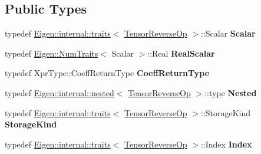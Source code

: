 \subsection*{Public Types}
\begin{DoxyCompactItemize}
\item 
\mbox{\label{class_eigen_1_1_tensor_reverse_op_ac42369cc21218288219c8ca109a981a8}} 
typedef \hyperlink{struct_eigen_1_1internal_1_1traits}{Eigen\+::internal\+::traits}$<$ \hyperlink{class_eigen_1_1_tensor_reverse_op}{Tensor\+Reverse\+Op} $>$\+::Scalar {\bfseries Scalar}
\item 
\mbox{\label{class_eigen_1_1_tensor_reverse_op_adf272883f88f102986b29b264d6e5833}} 
typedef \hyperlink{group___core___module_struct_eigen_1_1_num_traits}{Eigen\+::\+Num\+Traits}$<$ Scalar $>$\+::Real {\bfseries Real\+Scalar}
\item 
\mbox{\label{class_eigen_1_1_tensor_reverse_op_a960ec5b095276b6474499a1d2cca3b80}} 
typedef Xpr\+Type\+::\+Coeff\+Return\+Type {\bfseries Coeff\+Return\+Type}
\item 
\mbox{\label{class_eigen_1_1_tensor_reverse_op_a556b97a8fc026f6bc8c0e0004d400682}} 
typedef \hyperlink{struct_eigen_1_1internal_1_1nested}{Eigen\+::internal\+::nested}$<$ \hyperlink{class_eigen_1_1_tensor_reverse_op}{Tensor\+Reverse\+Op} $>$\+::type {\bfseries Nested}
\item 
\mbox{\label{class_eigen_1_1_tensor_reverse_op_a7e7939913a8d01fdbae7e8c930b49180}} 
typedef \hyperlink{struct_eigen_1_1internal_1_1traits}{Eigen\+::internal\+::traits}$<$ \hyperlink{class_eigen_1_1_tensor_reverse_op}{Tensor\+Reverse\+Op} $>$\+::Storage\+Kind {\bfseries Storage\+Kind}
\item 
\mbox{\label{class_eigen_1_1_tensor_reverse_op_adf5c7956449dbb32d43cd30af69e02bc}} 
typedef \hyperlink{struct_eigen_1_1internal_1_1traits}{Eigen\+::internal\+::traits}$<$ \hyperlink{class_eigen_1_1_tensor_reverse_op}{Tensor\+Reverse\+Op} $>$\+::Index {\bfseries Index}
\item 
\mbox{\label{class_eigen_1_1_tensor_reverse_op_ac42369cc21218288219c8ca109a981a8}} 

\end{DoxyCompactItemize}
